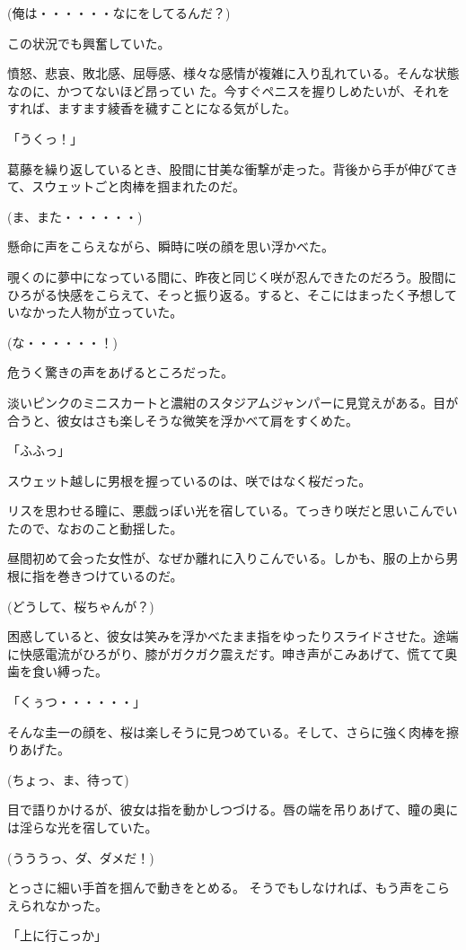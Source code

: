 ﻿\documentclass[book,tate]{jlreq}
\begin{document}
(俺は・・・・・・なにをしてるんだ？)

この状況でも興奮していた。

憤怒、悲哀、敗北感、屈辱感、様々な感情が複雑に入り乱れている。そんな状態なのに、かつてないほど昂ってい た。今すぐペニスを握りしめたいが、それをすれば、ますます綾香を穢すことになる気がした。

「うくっ！」

葛藤を繰り返しているとき、股間に甘美な衝撃が走った。背後から手が伸びてきて、スウェットごと肉棒を掴まれたのだ。

(ま、また・・・・・・)

懸命に声をこらえながら、瞬時に咲の顔を思い浮かべた。

覗くのに夢中になっている間に、昨夜と同じく咲が忍んできたのだろう。股間にひろがる快感をこらえて、そっと振り返る。すると、そこにはまったく予想していなかった人物が立っていた。

(な・・・・・・！)

危うく驚きの声をあげるところだった。

淡いピンクのミニスカートと濃紺のスタジアムジャンパーに見覚えがある。目が合うと、彼女はさも楽しそうな微笑を浮かべて肩をすくめた。

「ふふっ」

スウェット越しに男根を握っているのは、咲ではなく桜だった。

リスを思わせる瞳に、悪戯っぽい光を宿している。てっきり咲だと思いこんでいたので、なおのこと動揺した。

昼間初めて会った女性が、なぜか離れに入りこんでいる。しかも、服の上から男根に指を巻きつけているのだ。

(どうして、桜ちゃんが？)

困惑していると、彼女は笑みを浮かべたまま指をゆったりスライドさせた。途端に快感電流がひろがり、膝がガクガク震えだす。呻き声がこみあげて、慌てて奥歯を食い縛った。

「くぅつ・・・・・・」

そんな圭一の顔を、桜は楽しそうに見つめている。そして、さらに強く肉棒を擦りあげた。

(ちょっ、ま、待って)

目で語りかけるが、彼女は指を動かしつづける。唇の端を吊りあげて、瞳の奥には淫らな光を宿していた。

(うううっ、ダ、ダメだ！)

とっさに細い手首を掴んで動きをとめる。 そうでもしなければ、もう声をこらえられなかった。

「上に行こっか」
\end{document}
